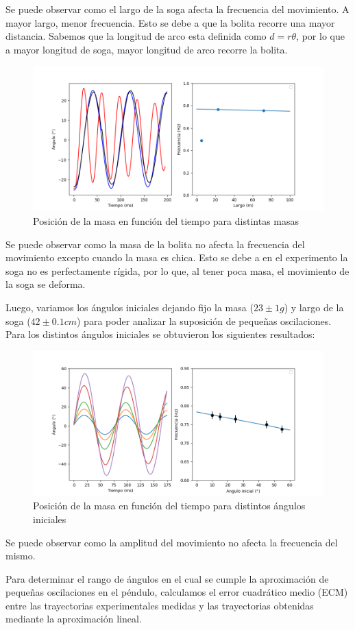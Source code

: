 \documentclass[12pt,a4]{article}
\begin{document}
Se puede observar como el largo de la soga afecta la frecuencia del movimiento. A mayor largo, menor frecuencia. Esto se debe a que la bolita recorre una mayor distancia. Sabemos que la longitud de arco esta definida como $d = r \theta$, por lo que a mayor longitud de soga, mayor longitud de arco recorre la bolita.

\begin{figure}[H]
    \centering
    \includegraphics[width=0.6\linewidth]{peso.png}
    \caption{Posición de la masa en función del tiempo para distintas masas}
    \label{fig:masa}
\end{figure}

Se puede observar como la masa de la bolita no afecta la frecuencia del movimiento excepto cuando la masa es chica. Esto se debe a en el experimento la soga no es perfectamente rígida, por lo que, al tener poca masa, el movimiento de la soga se deforma.

Luego, variamos los ángulos iniciales dejando fijo la masa ($23 \pm 1 g$) y largo de la soga ($42 \pm 0.1 cm$) para poder analizar la suposición de pequeñas oscilaciones. Para los distintos ángulos iniciales se obtuvieron los siguientes resultados:

\begin{figure}[H]
    \centering
    \includegraphics[width=0.6\linewidth]{angulos.png}
    \caption{Posición de la masa en función del tiempo para distintos ángulos iniciales}
    \label{fig:angulos}
\end{figure}

Se puede observar como la amplitud del movimiento no afecta la frecuencia del mismo.

Para determinar el rango de ángulos en el cual se cumple la aproximación de pequeñas oscilaciones en el péndulo, calculamos el error cuadrático medio (ECM) entre las trayectorias experimentales medidas y las trayectorias obtenidas mediante la aproximación lineal. 
\end{document}
